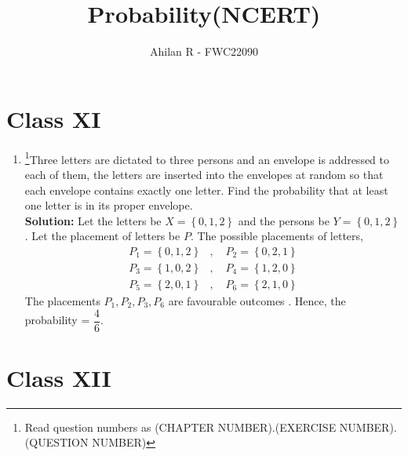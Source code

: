 \documentclass[journal,12pt,twocolumn]{IEEEtran}
\providecommand{\cbrak}[1]{\ensuremath{\left\{#1\right\}}}
\newcommand{\solution}{\noindent \textbf{Solution: }}
\begin{document}
\title{Probability(NCERT)}
\author{\Large Ahilan R - FWC22090}

\maketitle

\section*{Class XI}

\begin{enumerate}[label=16.\arabic{enumi}.\arabic{enumii}]%
\setcounter{enumi}{3}
\setcounter{enumii}{6}
\item \footnote{Read question numbers as (CHAPTER NUMBER).(EXERCISE NUMBER).(QUESTION NUMBER)}Three letters are dictated to three persons and an envelope is addressed to each of them, the letters are inserted into the envelopes at random so that each envelope contains exactly one letter. Find the probability that at least one letter is in its proper envelope.\\
	\solution
		Let the letters be $X = \cbrak{0,1,2}$ and the persons be $Y = \cbrak{0,1,2}$. Let the placement of letters be $P$.
  The possible placements of letters, %
  \begin{align*}
	  P_1 = \cbrak{0,1,2} &, \quad P_2 = \cbrak{0,2,1} \\
	  P_3 = \cbrak{1,0,2} &, \quad P_4 = \cbrak{1,2,0} \\
	  P_5 = \cbrak{2,0,1} &, \quad P_6 = \cbrak{2,1,0} 
  \end{align*}
		The placements $P_1, P_2, P_3, P_6$ are favourable outcomes . %
		Hence, the probability =  $\dfrac{4}{6}$.\\ %
		
\noindent{}
\end{enumerate}

\section*{Class XII}
\end{document}
